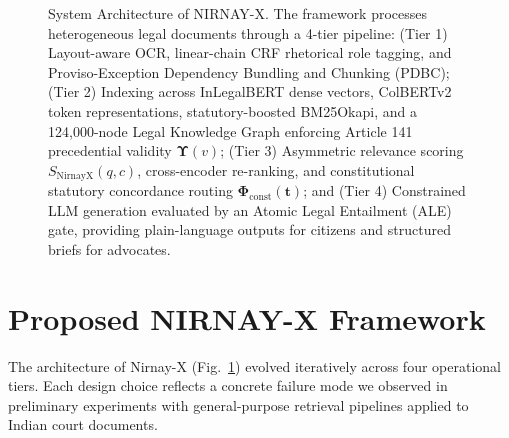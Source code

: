 \documentclass[conference]{IEEEtran}
\begin{document}
\begin{figure}[!t]
\caption{System Architecture of NIRNAY-X. The framework processes heterogeneous legal documents through a 4-tier pipeline: (Tier 1) Layout-aware OCR, linear-chain CRF rhetorical role tagging, and Proviso-Exception Dependency Bundling and Chunking (PDBC); (Tier 2) Indexing across InLegalBERT dense vectors, ColBERTv2 token representations, statutory-boosted BM25Okapi, and a 124,000-node Legal Knowledge Graph enforcing Article 141 precedential validity $\mathbf{\Upsilon}(v)$; (Tier 3) Asymmetric relevance scoring $S_{\text{NirnayX}}(q, c)$, cross-encoder re-ranking, and constitutional statutory concordance routing $\mathbf{\Phi}_{\text{const}}(\mathbf{t})$; and (Tier 4) Constrained LLM generation evaluated by an Atomic Legal Entailment (ALE) gate, providing plain-language outputs for citizens and structured briefs for advocates.}
\label{fig:architecture}
\end{figure}

\section{Proposed NIRNAY-X Framework}
The architecture of Nirnay-X (Fig.~\ref{fig:architecture}) evolved iteratively across four operational tiers. Each design choice reflects a concrete failure mode we observed in preliminary experiments with general-purpose retrieval pipelines applied to Indian court documents.
\end{document}
